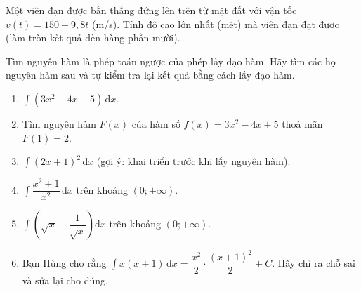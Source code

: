 \begin{bai}Một viên đạn được bắn thẳng đứng lên trên từ mặt đất với vận tốc $v(t)=150-9{,}8t$ (m/s). Tính độ cao lớn nhất (mét) mà viên đạn đạt được (làm tròn kết quả đến hàng phần mười).

\end{bai}

\begin{bai}Tìm nguyên hàm là phép toán ngược của phép lấy đạo hàm. Hãy tìm các họ nguyên hàm sau và tự kiểm tra lại kết quả bằng cách lấy đạo hàm.
\begin{enumerate}[label=\alph*)]
\item $\displaystyle\int(3x^2-4x+5)\,\mathrm dx$.
\item Tìm nguyên hàm $F(x)$ của hàm số $f(x)=3x^2-4x+5$ thoả mãn $F(1)=2$.
\item $\displaystyle\int(2x+1)^2\,\mathrm dx$ (gợi ý: khai triển trước khi lấy nguyên hàm).
\item $\displaystyle\int\dfrac{x^2+1}{x^2}\,\mathrm dx$ trên khoảng $(0;+\infty)$.
\item $\displaystyle\int\left(\sqrt x+\dfrac1{\sqrt x}\right)\mathrm dx$ trên khoảng $(0;+\infty)$.
\item Bạn Hùng cho rằng $\displaystyle\int x(x+1)\,\mathrm dx=\dfrac{x^2}2\cdot\dfrac{(x+1)^2}2+C$. Hãy chỉ ra chỗ sai và sửa lại cho đúng.
\end{enumerate}
\end{bai}

